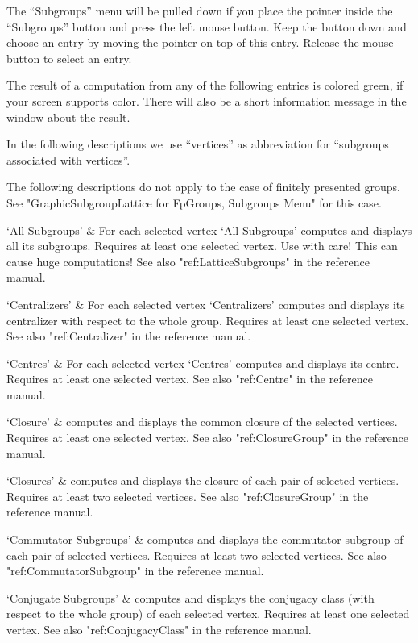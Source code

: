 The ``Subgroups'' menu will be pulled down  if you place the pointer inside
the ``Subgroups'' button and press the left mouse  button.  Keep the button
down and choose an entry   by moving the pointer  on  top of this  entry.
Release the mouse button to select an entry.

The result   of a computation from   any of the  following  entries is
colored green, if your screen supports color.  There will also be a short
information message in the {\GAP} window about the result.

In the following descriptions   we use ``vertices'' as abbreviation  for
``subgroups associated with vertices''.

The following descriptions do not apply to the case of finitely presented
groups. See "GraphicSubgroupLattice for FpGroups, Subgroups Menu" for this
case. 

\beginitems `All Subgroups' & 
For each selected vertex `All Subgroups' computes and displays all its
subgroups. Requires at least one selected vertex. Use with care! This can
cause huge computations!  See also "ref:LatticeSubgroups" in the {\GAP}
reference manual.

`Centralizers' &
For each selected vertex `Centralizers' computes and displays its
centralizer with respect to the whole group.  Requires at least one
selected vertex.  See also "ref:Centralizer" in the {\GAP}
reference manual.

`Centres' &
For each selected vertex `Centres' computes and displays its centre.
Requires at least one selected vertex. See also "ref:Centre" in the {\GAP}
reference manual.

`Closure' & 
computes and displays the common closure of the selected vertices.
Requires at least one selected vertex. See also "ref:ClosureGroup" in the
{\GAP} reference manual.

`Closures' &
computes and displays the closure of each pair of selected vertices.
Requires at least two selected vertices. See also "ref:ClosureGroup" in the
{\GAP} reference manual.

`Commutator Subgroups' &
computes and displays  the commutator  subgroup of each pair of selected
vertices.    Requires  at  least    two   selected  vertices. See    also
"ref:CommutatorSubgroup" in the {\GAP}
reference manual.

`Conjugate Subgroups' &
computes and displays the conjugacy  class (with  respect to the  whole
group) of each  selected vertex.  Requires  at least one selected vertex.
See also "ref:ConjugacyClass" in the {\GAP}
reference manual.

